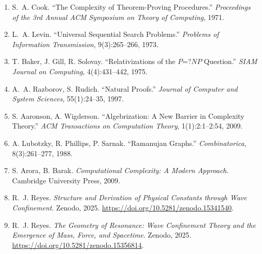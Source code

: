 \documentclass[12pt]{article}
\begin{document}
\begin{enumerate}

  \item S.~A. Cook.
  ``The Complexity of Theorem-Proving Procedures.''
  \textit{Proceedings of the 3rd Annual ACM Symposium on Theory of Computing}, 1971.

  \item L.~A. Levin.
  ``Universal Sequential Search Problems.''
  \textit{Problems of Information Transmission}, 9(3):265--266, 1973.

  \item T. Baker, J. Gill, R. Solovay.
  ``Relativizations of the $P$=?$NP$ Question.''
  \textit{SIAM Journal on Computing}, 4(4):431--442, 1975.

  \item A.~A. Razborov, S. Rudich.
  ``Natural Proofs.''
  \textit{Journal of Computer and System Sciences}, 55(1):24--35, 1997.

  \item S. Aaronson, A. Wigderson.
  ``Algebrization: A New Barrier in Complexity Theory.''
  \textit{ACM Transactions on Computation Theory}, 1(1):2:1--2:54, 2009.

  \item A. Lubotzky, R. Phillips, P. Sarnak.
  ``Ramanujan Graphs.''
  \textit{Combinatorica}, 8(3):261--277, 1988.

  \item S. Arora, B. Barak.
  \textit{Computational Complexity: A Modern Approach}.
  Cambridge University Press, 2009.

  \item R.~J. Reyes.
  \textit{Structure and Derivation of Physical Constants through Wave Confinement}.
  Zenodo, 2025. \url{https://doi.org/10.5281/zenodo.15341540}.

  \item R.~J. Reyes.
  \textit{The Geometry of Resonance: Wave Confinement Theory and the Emergence of Mass, Force, and Spacetime}.
  Zenodo, 2025. \url{https://doi.org/10.5281/zenodo.15356814}.

\end{enumerate}
\end{document}

